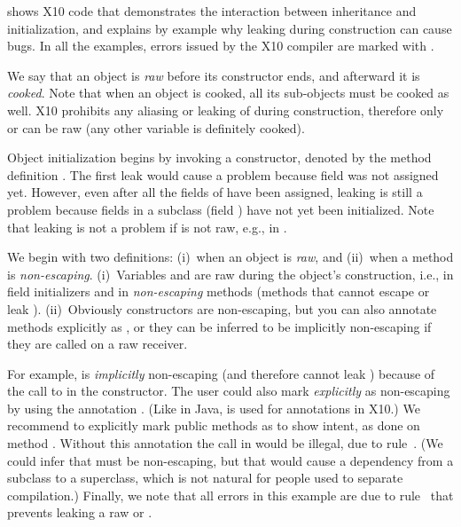  shows X10 code that demonstrates the interaction
    between inheritance and initialization,
    and explains by example why leaking \this during construction can cause bugs.
In all the examples, errors issued by the X10 compiler are marked with .

We say that an object is \emph{raw} before its constructor ends,
    and afterward it is \emph{cooked}.
Note that when an object is cooked, all its sub-objects must be cooked as well.
X10 prohibits any aliasing or leaking of \this during construction,
    therefore only \this or  can be raw (any other variable is definitely cooked).

Object initialization begins by invoking a constructor,
    denoted by the method definition .
The first leak would cause a problem because field  was not assigned yet.
However, even after all the fields of  have been assigned,
    leaking is still a problem
    because fields in a subclass (field ) have not yet been initialized.
Note that leaking is not a problem if \this is not raw, e.g., in .

We begin with two definitions:
    (i)~when an object is \emph{raw}, and
    (ii)~when a method is \emph{non-escaping}.
(i)~Variables \this and  are raw
    during the object's construction,
    i.e., in field initializers and in \emph{non-escaping} methods
    (methods that cannot escape or leak \this).
(ii)~Obviously constructors are non-escaping,
    but you can also annotate methods explicitly as ,
    or they can be inferred to be implicitly non-escaping
    if they are called on a raw \this receiver.

For example,  is \emph{implicitly} non-escaping (and therefore cannot leak \this)
    because of the call to 
    in the constructor.
The user could also mark  \emph{explicitly} as non-escaping by using the annotation
    .
(Like in Java,  is used for annotations in X10.)
We recommend to explicitly mark public methods as  to show intent,
    as done on method .
Without this annotation the call  in  would be illegal,
    due to rule~.
(We could infer that  must be non-escaping,
    but that would cause a dependency from a subclass to a superclass,
    which is not natural for people used to separate compilation.)
Finally, we note that all errors in this example are due to rule~
    that prevents leaking a raw \this or .




